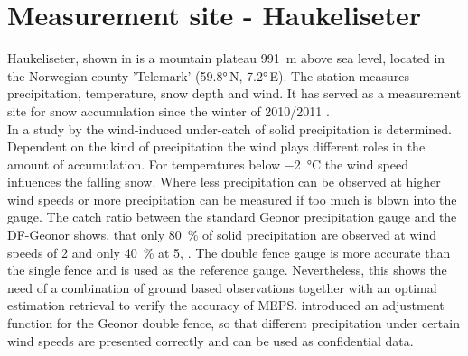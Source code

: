 \section{Measurement site - Haukeliseter}
\label{sec:site}

Haukeliseter, shown in  is a mountain plateau \SI{991}{\m} above sea level, located in the Norwegian county 'Telemark' (\ang{59.8}\,N, \ang{7.2}\,E). The station measures precipitation, temperature, snow depth and wind. It has served as a measurement site for snow accumulation since the winter of 2010/2011 \citep{wolff_new_2010, wolff_measurements_2013, wolff_derivation_2015}. 
\\
In a study by \cite{wolff_derivation_2015} the wind-induced under-catch of solid precipitation is determined. Dependent on the kind of precipitation the wind plays different roles in the amount of accumulation. For temperatures below \SI{-2}{\celsius} the wind speed influences the falling snow. Where less precipitation can be observed at higher wind speeds or more precipitation can be measured if too much is blown into the gauge. The catch ratio between the standard Geonor precipitation gauge and the DF-Geonor shows, that only \SI{80}{\percent} of solid precipitation are observed at wind speeds of \SI{2}{\mPs} and only \SI{40}{\percent} at \SI{5}{\mPs}, \cite[Figure 5 in][]{wolff_derivation_2015}. The double fence gauge is more accurate than the single fence and is used as the reference gauge.
Nevertheless, this shows the need of a combination of ground based observations together with an optimal estimation retrieval to verify the accuracy of MEPS. \cite{wolff_derivation_2015} introduced an adjustment function for the Geonor double fence, so that different precipitation under certain wind speeds are presented correctly and can be used as confidential data. 

